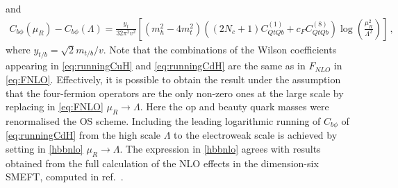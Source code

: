 	and
	\begin{equation}
		\begin{split}
			C_{b\phi}(\mu_R)-C_{b\phi}(\Lambda)= \frac{y_t}{32 \pi^2 v^2} \left[  (m_h^2-4 m_t^2)\left(  (2N_c+1)  C_{QtQb}^{(1)}+   c_F C_{QtQb}^{(8)}\right)\log\left( \frac{\mu_R^2}{\Lambda^2}\right)\right]\,, \label{eq:runningCdH}
		\end{split}
	\end{equation}
	where $y_{t/b}=\sqrt{2} m_{t/b}/v$.
	Note that the combinations of the Wilson coefficients appearing in \eqref{eq:runningCuH} and \eqref{eq:runningCdH} are the same as in $F_{NLO}$ in \eqref{eq:FNLO}.
	Effectively, it is possible to obtain the result under the assumption that the four-fermion operators are the only non-zero ones at the large scale by replacing in \eqref{eq:FNLO} $\mu_R \to \Lambda$. Here the  op and beauty quark masses were renormalised the OS scheme.
	Including the leading logarithmic running of $C_{b\phi}$ of \eqref{eq:runningCdH} from the high scale $\Lambda$ to the electroweak scale is achieved by setting in \eqref{hbbnlo} $\mu_R\to \Lambda$.
	The expression in \eqref{hbbnlo} agrees with results obtained from the full calculation of the NLO effects in the dimension-six SMEFT, computed in ref.~\cite{Gauld:2015lmb}. 

